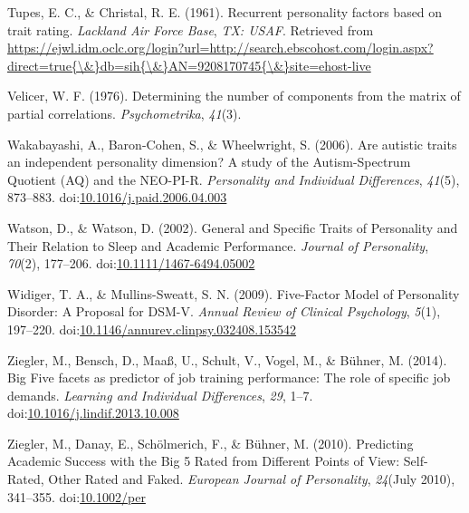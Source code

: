 \documentclass[,man,floatsintext]{apa6}
\begin{document}
\hypertarget{ref-TupesChristal1961}{}
Tupes, E. C., \& Christal, R. E. (1961). Recurrent personality factors
based on trait rating. \emph{Lackland Air Force Base}, \emph{TX: USAF}.
Retrieved from
\href{https://ejwl.idm.oclc.org/login?url=http://search.ebscohost.com/login.aspx?direct=true\%7B/\&\%7Ddb=sih\%7B/\&\%7DAN=9208170745\%7B/\&\%7Dsite=ehost-live}{https://ejwl.idm.oclc.org/login?url=http://search.ebscohost.com/login.aspx?direct=true\{\textbackslash{}\&\}db=sih\{\textbackslash{}\&\}AN=9208170745\{\textbackslash{}\&\}site=ehost-live}

\hypertarget{ref-Velicer1976}{}
Velicer, W. F. (1976). Determining the number of components from the
matrix of partial correlations. \emph{Psychometrika}, \emph{41}(3).

\hypertarget{ref-Wakabayashi2006}{}
Wakabayashi, A., Baron-Cohen, S., \& Wheelwright, S. (2006). Are
autistic traits an independent personality dimension? A study of the
Autism-Spectrum Quotient (AQ) and the NEO-PI-R. \emph{Personality and
Individual Differences}, \emph{41}(5), 873--883.
doi:\href{https://doi.org/10.1016/j.paid.2006.04.003}{10.1016/j.paid.2006.04.003}

\hypertarget{ref-Watson2002}{}
Watson, D., \& Watson, D. (2002). General and Specific Traits of
Personality and Their Relation to Sleep and Academic Performance.
\emph{Journal of Personality}, \emph{70}(2), 177--206.
doi:\href{https://doi.org/10.1111/1467-6494.05002}{10.1111/1467-6494.05002}

\hypertarget{ref-WidigerMullins2009}{}
Widiger, T. A., \& Mullins-Sweatt, S. N. (2009). Five-Factor Model of
Personality Disorder: A Proposal for DSM-V. \emph{Annual Review of
Clinical Psychology}, \emph{5}(1), 197--220.
doi:\href{https://doi.org/10.1146/annurev.clinpsy.032408.153542}{10.1146/annurev.clinpsy.032408.153542}

\hypertarget{ref-Ziegler2014}{}
Ziegler, M., Bensch, D., Maaß, U., Schult, V., Vogel, M., \& Bühner, M.
(2014). Big Five facets as predictor of job training performance: The
role of specific job demands. \emph{Learning and Individual
Differences}, \emph{29}, 1--7.
doi:\href{https://doi.org/10.1016/j.lindif.2013.10.008}{10.1016/j.lindif.2013.10.008}

\hypertarget{ref-Ziegler2010}{}
Ziegler, M., Danay, E., Schölmerich, F., \& Bühner, M. (2010).
Predicting Academic Success with the Big 5 Rated from Different Points
of View: Self-Rated, Other Rated and Faked. \emph{European Journal of
Personality}, \emph{24}(July 2010), 341--355.
doi:\href{https://doi.org/10.1002/per}{10.1002/per}

\endgroup

\clearpage

\renewcommand{\listtablename}{Table captions}

\listoftables
\end{document}
